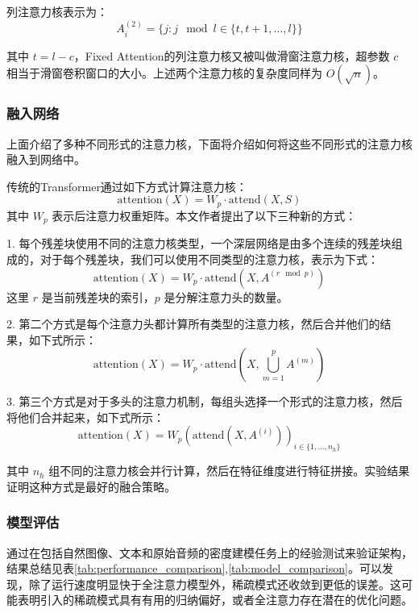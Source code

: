 列注意力核表示为：
\[
A_i^{(2)} = \{j: j \mod l \in \{t, t+1, \ldots, l\}\}
\]

其中 \( t = l - c \)，Fixed Attention的列注意力核又被叫做滑窗注意力核，超参数 \( c \) 相当于滑窗卷积窗口的大小。上述两个注意力核的复杂度同样为 \( O(\sqrt{n}) \)。

\subsubsection{融入网络}

上面介绍了多种不同形式的注意力核，下面将介绍如何将这些不同形式的注意力核融入到网络中。

传统的Transformer通过如下方式计算注意力核：
\[
\text{attention}(X) = W_p \cdot \text{attend}(X, S)
\]
其中 \( W_p \) 表示后注意力权重矩阵。本文作者提出了以下三种新的方式：

1. 每个残差块使用不同的注意力核类型，一个深层网络是由多个连续的残差块组成的，对于每个残差块，我们可以使用不同类型的注意力核，表示为下式：
\[
\text{attention}(X) = W_p \cdot \text{attend}\left(X, A^{(r \mod p)}\right)
\]
这里 \( r \) 是当前残差块的索引，\( p \) 是分解注意力头的数量。

2. 第二个方式是每个注意力头都计算所有类型的注意力核，然后合并他们的结果，如下式所示：
\[
\text{attention}(X) = W_p \cdot \text{attend}\left(X, \bigcup_{m=1}^p A^{(m)}\right)
\]

3. 第三个方式是对于多头的注意力机制，每组头选择一个形式的注意力核，然后将他们合并起来，如下式所示：
\[
\text{attention}(X) = W_p \left(\text{attend}(X, A^{(i)})\right)_{i \in \{1, \ldots, n_h\}}
\]

其中 \( n_h \) 组不同的注意力核会并行计算，然后在特征维度进行特征拼接。实验结果证明这种方式是最好的融合策略。


\subsubsection{模型评估}
通过在包括自然图像、文本和原始音频的密度建模任务上的经验测试来验证架构，结果总结见表\ref{tab:performance_comparison},\ref{tab:model_comparison}。可以发现，除了运行速度明显快于全注意力模型外，稀疏模式还收敛到更低的误差。这可能表明引入的稀疏模式具有有用的归纳偏好，或者全注意力存在潜在的优化问题。